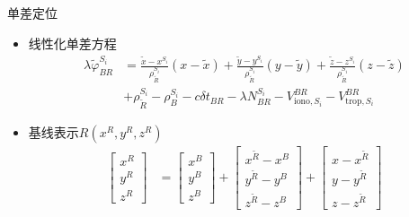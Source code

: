 \begin{frame}{单差定位}
    \begin{itemize}
        \item 线性化单差方程
        \begin{align*}
            \lambda \tilde \varphi _ { BR } ^ { S _ i } &= \frac{ \tilde x - x ^ { S _ i } }{ \rho _ { \tilde R } ^ { S _ i } } \left( x - \tilde x \right)
            + \frac{ \tilde y - y ^ { S _ i } }{ \rho _ { \tilde R } ^ { S _ i } } \left( y - \tilde y \right)
            + \frac{ \tilde z - z ^ { S _ i } }{ \rho _ { \tilde R } ^ { S _ i } } \left( z - \tilde z \right) \\
            &+ \rho _ { \tilde R } ^ { S _ i } - \rho _ B ^ { S _ i } - c \delta t _ { BR } - \lambda N _ { BR } ^ { S _ i }
            - V _ { \mathrm{ iono }, S _ i } ^ { BR } - V _ { \mathrm{ trop }, S _ i } ^ { BR }
        \end{align*}
        \item 基线表示$R\left( x ^ R, y ^ R, z ^R \right)$
        \begin{align*}
            \begin{bmatrix} x ^ R \\ y ^ R \\ z ^ R \end{bmatrix} &=
            \begin{bmatrix} x ^ B \\ y ^ B \\ z ^ B \end{bmatrix} +
            \begin{bmatrix} x ^ { \tilde R } - x ^ B \\ y ^ { \tilde R } - y ^ B \\ z ^ { \tilde R } - z ^ B \end{bmatrix} +
            \begin{bmatrix} x - x ^ { \tilde R } \\ y - y ^ { \tilde R } \\ z - z ^ { \tilde R } \end{bmatrix}
        \end{align*}
    \end{itemize}
\end{frame}

